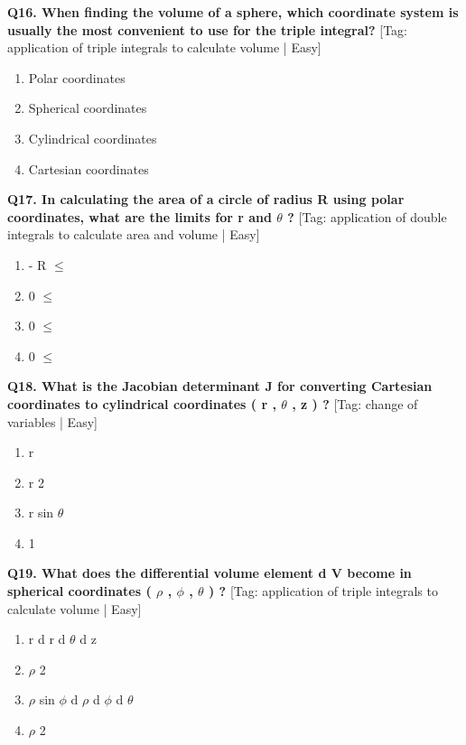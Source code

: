 \noindent\textbf{Q16. When finding the volume of a sphere, which coordinate system is usually the most convenient to use for the triple integral?} \hfill [Tag: application of triple integrals to calculate volume | Easy]
\begin{enumerate}[label=(\alph*),topsep=2pt,itemsep=1pt,partopsep=0pt,parsep=0pt]
    \item {{Polar coordinates}}
    \item {{Spherical coordinates}}
    \item {{Cylindrical coordinates}}
    \item {{Cartesian coordinates}}
\end{enumerate}
\vspace{2mm}

\noindent\textbf{Q17. In calculating the area of a circle of radius R using polar coordinates, what are the limits for r and $\theta$ ?} \hfill [Tag: application of double integrals to calculate area and volume | Easy]
\begin{enumerate}[label=(\alph*),topsep=2pt,itemsep=1pt,partopsep=0pt,parsep=0pt]
    \item {{- R $\le$}}
    \item {{0 $\le$}}
    \item {{0 $\le$}}
    \item {{0 $\le$}}
\end{enumerate}
\vspace{2mm}

\noindent\textbf{Q18. What is the Jacobian determinant J for converting Cartesian coordinates to cylindrical coordinates ( r , $\theta$ , z ) ?} \hfill [Tag: change of variables | Easy]
\begin{enumerate}[label=(\alph*),topsep=2pt,itemsep=1pt,partopsep=0pt,parsep=0pt]
    \item {{r}}
    \item {{r 2}}
    \item {{r sin $\theta$}}
    \item {{1}}
\end{enumerate}
\vspace{2mm}

\noindent\textbf{Q19. What does the differential volume element d V become in spherical coordinates ( $\rho$ , $\phi$ , $\theta$ ) ?} \hfill [Tag: application of triple integrals to calculate volume | Easy]
\begin{enumerate}[label=(\alph*),topsep=2pt,itemsep=1pt,partopsep=0pt,parsep=0pt]
    \item {{r d r d $\theta$ d z}}
    \item {{$\rho$ 2}}
    \item {{$\rho$ sin $\phi$ d $\rho$ d $\phi$ d $\theta$}}
    \item {{$\rho$ 2}}
\end{enumerate}
\vspace{2mm}

